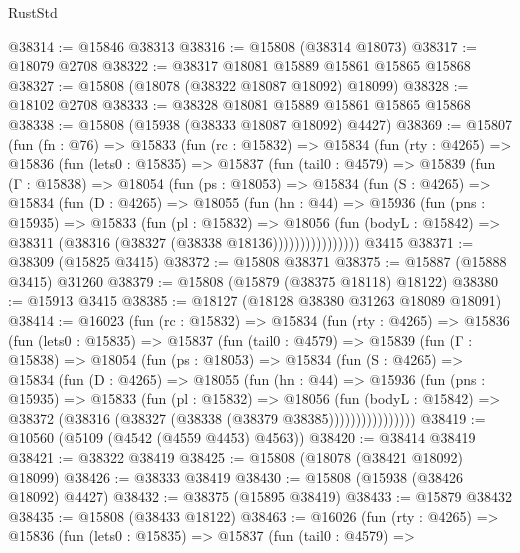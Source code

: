 \begin{lexlean}{RustStd}
\begin{coremodule}
@38314 := @15846 @38313
@38316 := @15808 (@38314 @18073)
@38317 := @18079 @2708
@38322 := @38317 @18081 @15889 @15861 @15865 @15868
@38327 := @15808 (@18078 (@38322 @18087 @18092) @18099)
@38328 := @18102 @2708
@38333 := @38328 @18081 @15889 @15861 @15865 @15868
@38338 := @15808 (@15938 (@38333 @18087 @18092) @4427)
@38369 := @15807
    (fun (fn : @76) =>
    @15833
      (fun (rc : @15832) =>
      @15834
        (fun (rty : @4265) =>
        @15836
          (fun (lets0 : @15835) =>
          @15837
            (fun (tail0 : @4579) =>
            @15839
              (fun (Γ : @15838) =>
              @18054
                (fun (ps : @18053) =>
                @15834
                  (fun (S : @4265) =>
                  @15834
                    (fun (D : @4265) =>
                    @18055
                      (fun (hn : @44) =>
                      @15936
                        (fun (pns : @15935) =>
                        @15833
                          (fun (pl : @15832) =>
                          @18056
                            (fun (bodyL : @15842) =>
                            @38311 (@38316 (@38327 (@38338 @18136))))))))))))))))
    @3415
@38371 := @38309 (@15825 @3415)
@38372 := @15808 @38371
@38375 := @15887 (@15888 @3415) @31260
@38379 := @15808 (@15879 (@38375 @18118) @18122)
@38380 := @15913 @3415
@38385 := @18127 (@18128 @38380 @31263 @18089 @18091)
@38414 := @16023
    (fun (rc : @15832) =>
    @15834
      (fun (rty : @4265) =>
      @15836
        (fun (lets0 : @15835) =>
        @15837
          (fun (tail0 : @4579) =>
          @15839
            (fun (Γ : @15838) =>
            @18054
              (fun (ps : @18053) =>
              @15834
                (fun (S : @4265) =>
                @15834
                  (fun (D : @4265) =>
                  @18055
                    (fun (hn : @44) =>
                    @15936
                      (fun (pns : @15935) =>
                      @15833
                        (fun (pl : @15832) =>
                        @18056
                          (fun (bodyL : @15842) =>
                          @38372 (@38316 (@38327 (@38338 (@38379 @38385))))))))))))))))
@38419 := @10560 (@5109 (@4542 (@4559 @4453) @4563))
@38420 := @38414 @38419
@38421 := @38322 @38419
@38425 := @15808 (@18078 (@38421 @18092) @18099)
@38426 := @38333 @38419
@38430 := @15808 (@15938 (@38426 @18092) @4427)
@38432 := @38375 (@15895 @38419)
@38433 := @15879 @38432
@38435 := @15808 (@38433 @18122)
@38463 := @16026
    (fun (rty : @4265) =>
    @15836
      (fun (lets0 : @15835) =>
      @15837
        (fun (tail0 : @4579) =>

\end{coremodule}
\end{lexlean}
